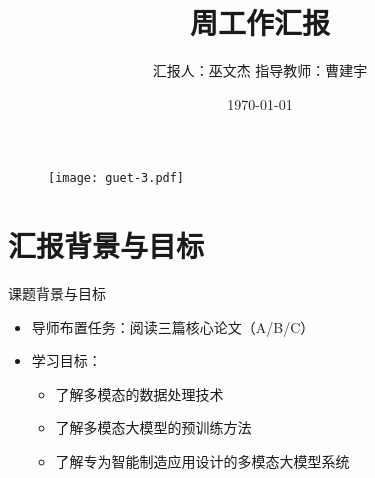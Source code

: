 \documentclass[aspectratio=169,AutoFakeBold]{beamer}
\author{汇报人：巫文杰 \texorpdfstring{\quad}{} 指导教师：曹建宇}
\title{周工作汇报}
\institute{计算机与信息安全学院}
\date{\today}
\begin{document}
\kaishu
\begin{frame}
    \titlepage
    \begin{figure}[htpb]
        \begin{center}
            \texttt{[image: guet-3.pdf]}
        \end{center}
    \end{figure}
\end{frame}

\begin{frame}
    \tableofcontents[sectionstyle=show,subsectionstyle=show/shaded/hide,subsubsectionstyle=show/shaded/hide]    
\end{frame}

\section{汇报背景与目标}
\begin{frame}{课题背景与目标}
    \begin{itemize}[<+-| alert@+>]
        \item 导师布置任务：阅读三篇核心论文（A/B/C）
        \item 学习目标：
            \begin{itemize}
                \item 了解多模态的数据处理技术
                \item 了解多模态大模型的预训练方法
                \item 了解专为智能制造应用设计的多模态大模型系统
            \end{itemize}
    \end{itemize}
\end{frame}
\end{document}
